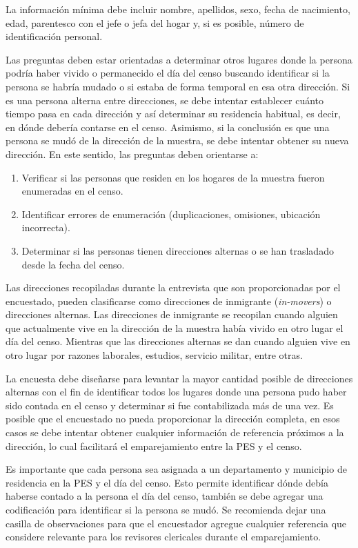 \documentclass[
  12pt,
]{book}
\providecommand{\tightlist}{%
  \setlength{\itemsep}{0pt}\setlength{\parskip}{0pt}}
\begin{document}
La información mínima debe incluir nombre, apellidos, sexo, fecha de nacimiento, edad, parentesco con el jefe o jefa del hogar y, si es posible, número de identificación personal.

Las preguntas deben estar orientadas a determinar otros lugares donde la persona podría haber vivido o permanecido el día del censo buscando identificar si la persona se habría mudado o si estaba de forma temporal en esa otra dirección. Si es una persona alterna entre direcciones, se debe intentar establecer cuánto tiempo pasa en cada dirección y así determinar su residencia habitual, es decir, en dónde debería contarse en el censo. Asimismo, si la conclusión es que una persona se mudó de la dirección de la muestra, se debe intentar obtener su nueva dirección. En este sentido, las preguntas deben orientarse a:

\begin{enumerate}
\def\labelenumi{\arabic{enumi}.}
\tightlist
\item
  Verificar si las personas que residen en los hogares de la muestra fueron enumeradas en el censo.
\item
  Identificar errores de enumeración (duplicaciones, omisiones, ubicación incorrecta).
\item
  Determinar si las personas tienen direcciones alternas o se han trasladado desde la fecha del censo.
\end{enumerate}

Las direcciones recopiladas durante la entrevista que son proporcionadas por el encuestado, pueden clasificarse como direcciones de inmigrante (\emph{in-movers}) o direcciones alternas. Las direcciones de inmigrante se recopilan cuando alguien que actualmente vive en la dirección de la muestra había vivido en otro lugar el día del censo. Mientras que las direcciones alternas se dan cuando alguien vive en otro lugar por razones laborales, estudios, servicio militar, entre otras.

La encuesta debe diseñarse para levantar la mayor cantidad posible de direcciones alternas con el fin de identificar todos los lugares donde una persona pudo haber sido contada en el censo y determinar si fue contabilizada más de una vez. Es posible que el encuestado no pueda proporcionar la dirección completa, en esos casos se debe intentar obtener cualquier información de referencia próximos a la dirección, lo cual facilitará el emparejamiento entre la PES y el censo.

Es importante que cada persona sea asignada a un departamento y municipio de residencia en la PES y el día del censo. Esto permite identificar dónde debía haberse contado a la persona el día del censo, también se debe agregar una codificación para identificar si la persona se mudó. Se recomienda dejar una casilla de observaciones para que el encuestador agregue cualquier referencia que considere relevante para los revisores clericales durante el emparejamiento.
\end{document}
